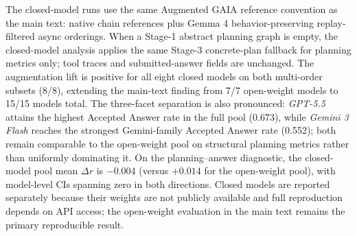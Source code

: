 \documentclass{article}
\providecommand{\model}[1]{\emph{#1}}
\begin{document}
The closed-model runs use the same Augmented GAIA reference convention as the
main text: native chain references plus Gemma 4 behavior-preserving
replay-filtered async orderings. When a Stage-1 abstract planning graph is empty,
the closed-model analysis applies the same Stage-3 concrete-plan fallback for
planning metrics only; tool traces and submitted-answer fields are unchanged.
The augmentation lift is positive for all eight closed models on both
multi-order subsets (8/8), extending the main-text finding from 7/7 open-weight
models to 15/15 models total. The three-facet separation is also pronounced:
\model{GPT-5.5} attains the highest Accepted Answer rate in the full pool
(0.673), while \model{Gemini 3 Flash} reaches the strongest Gemini-family
Accepted Answer rate (0.552); both remain comparable to the open-weight pool on
structural planning metrics rather than uniformly dominating it. On the
planning--answer diagnostic, the closed-model pool mean $\Delta r$ is $-0.004$
(versus $+0.014$ for the open-weight pool), with model-level CIs spanning zero in
both directions.
Closed models are reported separately because their weights are not publicly
available and full reproduction depends on API access; the open-weight
evaluation in the main text remains the primary reproducible result.
\end{document}
